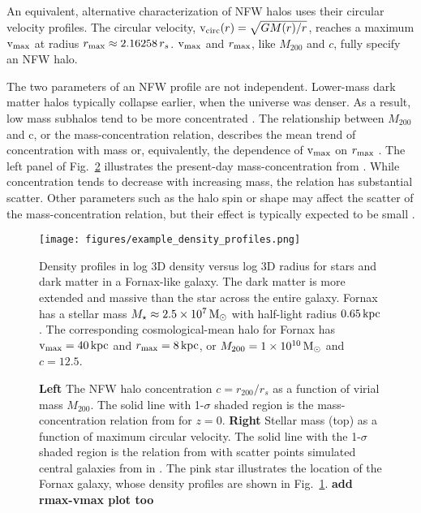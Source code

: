 An equivalent, alternative characterization of NFW halos uses their
circular velocity profiles. The circular velocity,
\({\rm v}_{\rm circ}(r) = \sqrt{G M(r) / r}\), reaches a maximum \({\rm v}_{\rm max}\) at radius
\(r_{\rm max} \approx 2.16258\,r_s\). \({\rm v}_{\rm max}\) and \(r_{\rm max}\), like
\(M_{200}\) and \(c\), fully specify an NFW halo.

The two parameters of an NFW profile are not independent. Lower-mass
dark matter halos typically collapse earlier, when the universe was
denser. As a result, low mass subhalos tend to be more concentrated
\citep[e.g.,][]{NFW1997}. The relationship between \(M_{200}\) and c, or
the mass-concentration relation, describes the mean trend of
concentration with mass or, equivalently, the dependence of \({\rm v}_{\rm max}\) on
\(r_{\rm max}\) \citep[e.g.,][]{bullock+2001, ludlow+2016}. The left panel of
Fig.~\ref{fig:smhm} illustrates the present-day mass-concentration from
\citet{ludlow+2016}. While concentration tends to decrease with
increasing mass, the relation has substantial scatter. Other parameters
such as the halo spin or shape may affect the scatter of the
mass-concentration relation, but their effect is typically expected to
be small \citep{navarro+2010, dicintio+2013, dutton+maccio2014}.

\begin{figure}
\centering
\texttt{[image: figures/example\_density\_profiles.png]}
\caption[Example dark matter and stellar density profiles]{Density
profiles in log 3D density versus log 3D radius for stars and dark
matter in a Fornax-like galaxy. The dark matter is more extended and
massive than the star across the entire galaxy. Fornax has a stellar
mass \(M_\star \approx 2.5\times10^7\,{\rm M}_{\odot}\) with half-light radius
\(0.65\,{\rm kpc}\) \citep{munoz+2018, woo+courteau+dekel2008}. The
corresponding cosmological-mean halo for Fornax has \({\rm v}_{\rm max}=40\,{\rm kpc}\)
and \(r_{\rm max}=8\,{\rm kpc}\), or \(M_{200} = 1\times10^{10}\,{\rm M}_{\odot}\) and
\(c=12.5\).}\label{fig:nfw_density}
\end{figure}

\begin{figure}
\centering
{}
\caption[Cosmological halo mass and stellar mass
relations]{\textbf{Left} The NFW halo concentration \(c=r_{200} / r_s\)
as a function of virial mass \(M_{200}\). The solid line with
1-\(\sigma\) shaded region is the mass-concentration relation from
\citet{ludlow+2016} for \(z=0\). \textbf{Right} Stellar mass (top) as a
function of maximum circular velocity. The solid line with the
1-\(\sigma\) shaded region is the relation from \citet{fattahi+2018}
with scatter points simulated central galaxies from \apostle{} in
\citet{fattahi+2018}. The pink star illustrates the location of the
Fornax galaxy, whose density profiles are shown in
Fig.~\ref{fig:nfw_density}. \textbf{add rmax-vmax plot
too}}\label{fig:smhm}
\end{figure}

